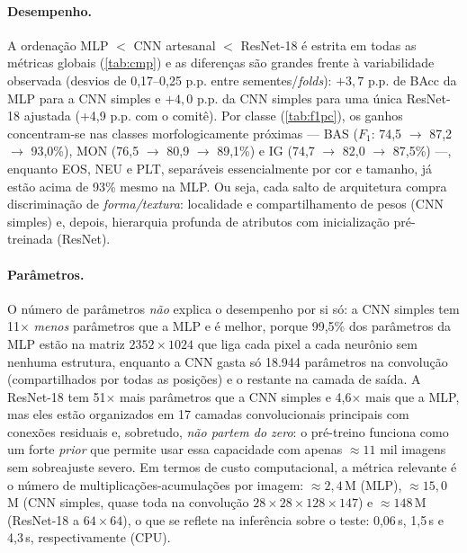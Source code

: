 \paragraph{Desempenho.} A ordenação MLP $<$ CNN artesanal $<$ ResNet-18 é estrita em todas as métricas
globais (\cref{tab:cmp}) e as diferenças são grandes frente à variabilidade observada (desvios de
0,17--0,25 p.p. entre sementes/\emph{folds}): $+3{,}7$ p.p. de BAcc da MLP para a CNN simples e $+4{,}0$ p.p. da
CNN simples para uma única ResNet-18 ajustada (+4,9 p.p. com o comitê). Por classe (\cref{tab:f1pc}), os
ganhos concentram-se nas classes morfologicamente próximas --- BAS ($F_1$: 74,5 $\to$ 87,2 $\to$ 93,0\%),
MON (76,5 $\to$ 80,9 $\to$ 89,1\%) e IG (74,7 $\to$ 82,0 $\to$ 87,5\%) ---, enquanto EOS, NEU e PLT, separáveis
essencialmente por cor e tamanho, já estão acima de 93\% mesmo na MLP. Ou seja, cada salto de
arquitetura compra discriminação de \emph{forma/textura}: localidade e compartilhamento de pesos (CNN
simples) e, depois, hierarquia profunda de atributos com inicialização pré-treinada (ResNet).

\paragraph{Parâmetros.} O número de parâmetros \emph{não} explica o desempenho por si só: a CNN simples tem
11$\times$ \emph{menos} parâmetros que a MLP e é melhor, porque 99,5\% dos parâmetros da MLP estão na matriz
$2352\times1024$ que liga cada pixel a cada neurônio sem nenhuma estrutura, enquanto a CNN gasta só 18.944
parâmetros na convolução (compartilhados por todas as posições) e o restante na camada de saída. A ResNet-18
tem 51$\times$ mais parâmetros que a CNN simples e 4,6$\times$ mais que a MLP, mas eles estão
organizados em 17 camadas convolucionais principais com conexões residuais e, sobretudo, \emph{não partem do zero}: o
pré-treino funciona como um forte \emph{prior} que permite usar essa capacidade com apenas $\approx11$ mil
imagens sem sobreajuste severo. Em termos de custo computacional, a métrica relevante é o número de
multiplicações-acumulações por imagem: $\approx2{,}4$\,M (MLP), $\approx15{,}0$\,M (CNN simples, quase toda
na convolução $28\times28\times128\times147$) e $\approx148$\,M (ResNet-18 a $64\times64$), o que se reflete
na inferência sobre o teste: 0,06\,s, 1,5\,s e 4,3\,s, respectivamente (CPU).


